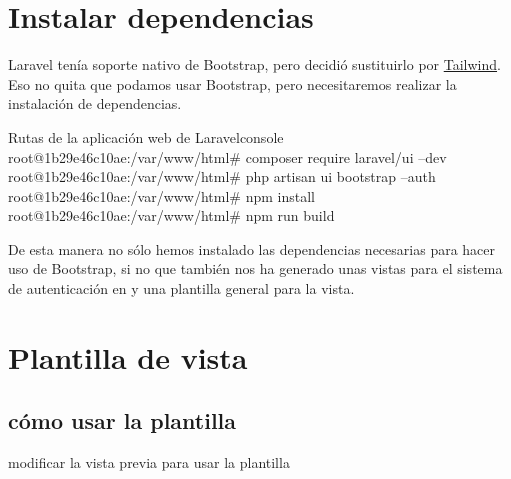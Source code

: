 \chapter{Instalar dependencias}

Laravel tenía soporte nativo de Bootstrap, pero decidió sustituirlo por \href{https://tailwindcss.com/}{Tailwind}. Eso no quita que podamos usar Bootstrap, pero necesitaremos realizar la instalación de dependencias.

\begin{mycode}{Rutas de la aplicación web de Laravel}{console}{}
root@1b29e46c10ae:/var/www/html# composer require laravel/ui --dev
root@1b29e46c10ae:/var/www/html# php artisan ui bootstrap --auth
root@1b29e46c10ae:/var/www/html# npm install
root@1b29e46c10ae:/var/www/html# npm run build
\end{mycode}

De esta manera no sólo hemos instalado las dependencias necesarias para hacer uso de Bootstrap, si no que también nos ha generado unas vistas para el sistema de autenticación en  y una plantilla general para la vista.


\chapter{Plantilla de vista}

\section{cómo usar la plantilla}

modificar la vista previa para usar la plantilla